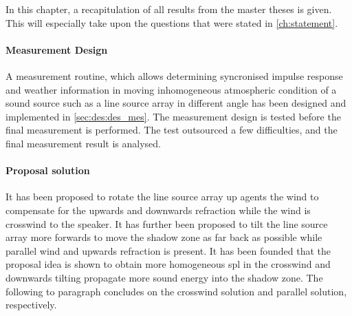 


In this chapter, a recapitulation of all results from the master theses is given. This will especially take upon the questions that were stated in \autoref{ch:statement}.

\paragraph{Measurement Design}
A measurement routine, which allows determining syncronised impulse response and weather information in moving inhomogeneous atmospheric condition of a sound source such as a line source array in different angle has been designed and implemented in \matlab \autoref{sec:des:des_mes}. The measurement design is tested before the final measurement is performed. The test outsourced a few difficulties, and the final measurement result is analysed.



\paragraph{Proposal solution}
It has been proposed to rotate the line source array up agents the wind to compensate for the upwards and downwards refraction while the wind is crosswind to the speaker. It has further been proposed to tilt the line source array more forwards to move the shadow zone as far back as possible while parallel wind and upwards refraction is present. It has been founded that the proposal idea is shown to obtain more homogeneous \gls{spl} in the crosswind and downwards tilting propagate more sound energy into the shadow zone. The following to paragraph concludes on the crosswind solution and parallel solution, respectively.   




